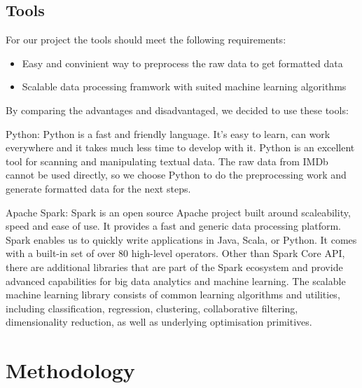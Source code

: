 \documentclass{vldb}
\begin{document}
\subsection{Tools}
\par For our project the tools should meet the following requirements:
\begin{itemize}
\item {Easy and convinient way to preprocess the raw data to get formatted data}
\item {Scalable data processing framwork with suited machine learning algorithms}
\end{itemize}
\par By comparing the advantages and disadvantaged, we decided to use these tools:
\par Python: Python is a fast and friendly language. It's easy to learn, can work everywhere and it takes much less time to develop with it. Python is an excellent tool for scanning and manipulating textual data. The raw data from IMDb cannot be used directly, so we choose Python to do the preprocessing work and generate formatted data for the next steps. 
\par Apache Spark: Spark is an open source Apache project built around scaleability, speed and ease of use. It provides a fast and generic data processing platform. Spark enables us to quickly write applications in Java, Scala, or Python. It comes with a built-in set of over 80 high-level operators. Other than Spark Core API, there are additional libraries that are part of the Spark ecosystem and provide advanced capabilities for big data analytics and machine learning. The scalable machine learning library consists of common learning algorithms and utilities, including classification, regression, clustering, collaborative filtering, dimensionality reduction, as well as underlying optimisation primitives.

\section{Methodology}
\end{document}
